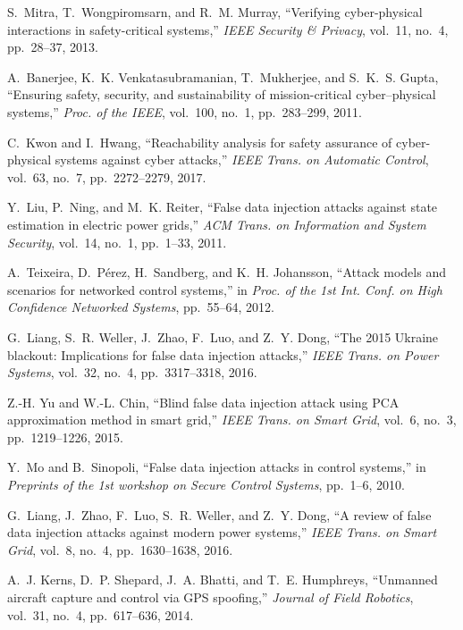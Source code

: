 \documentclass[journal]{IEEEtran}
\begin{document}
\begin{thebibliography}{10}

S.~Mitra, T.~Wongpiromsarn, and R.~M. Murray, ``Verifying cyber-physical
  interactions in safety-critical systems,'' {\em IEEE Security \& Privacy},
  vol.~11, no.~4, pp.~28--37, 2013.

A.~Banerjee, K.~K. Venkatasubramanian, T.~Mukherjee, and S.~K.~S. Gupta,
  ``Ensuring safety, security, and sustainability of mission-critical
  cyber--physical systems,'' {\em Proc. of the IEEE}, vol.~100, no.~1,
  pp.~283--299, 2011.

C.~Kwon and I.~Hwang, ``Reachability analysis for safety assurance of
  cyber-physical systems against cyber attacks,'' {\em IEEE Trans. on Automatic
  Control}, vol.~63, no.~7, pp.~2272--2279, 2017.

Y.~Liu, P.~Ning, and M.~K. Reiter, ``False data injection attacks against state
  estimation in electric power grids,'' {\em ACM Trans. on Information and
  System Security}, vol.~14, no.~1, pp.~1--33, 2011.

A.~Teixeira, D.~P{\'e}rez, H.~Sandberg, and K.~H. Johansson, ``Attack models
  and scenarios for networked control systems,'' in {\em Proc. of the 1st Int.
  Conf. on High Confidence Networked Systems}, pp.~55--64, 2012.

G.~Liang, S.~R. Weller, J.~Zhao, F.~Luo, and Z.~Y. Dong, ``The 2015 {Ukraine}
  blackout: Implications for false data injection attacks,'' {\em IEEE Trans.
  on Power Systems}, vol.~32, no.~4, pp.~3317--3318, 2016.

Z.-H. Yu and W.-L. Chin, ``Blind false data injection attack using {PCA}
  approximation method in smart grid,'' {\em IEEE Trans. on Smart Grid},
  vol.~6, no.~3, pp.~1219--1226, 2015.

Y.~Mo and B.~Sinopoli, ``False data injection attacks in control systems,'' in
  {\em Preprints of the 1st workshop on Secure Control Systems}, pp.~1--6,
  2010.

G.~Liang, J.~Zhao, F.~Luo, S.~R. Weller, and Z.~Y. Dong, ``A review of false
  data injection attacks against modern power systems,'' {\em IEEE Trans. on
  Smart Grid}, vol.~8, no.~4, pp.~1630--1638, 2016.

A.~J. Kerns, D.~P. Shepard, J.~A. Bhatti, and T.~E. Humphreys, ``Unmanned
  aircraft capture and control via {GPS} spoofing,'' {\em Journal of Field
  Robotics}, vol.~31, no.~4, pp.~617--636, 2014.


\end{thebibliography}
\end{document}
